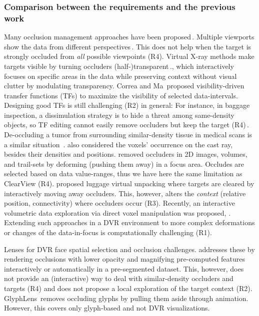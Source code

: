 \subsubsection{ Comparison between the requirements and the previous work }

Many occlusion management approaches have been proposed\,\cite{4483791}. Multiple viewports show the data from different perspectives\,\cite{WangBaldonado:2000:GUM:345513.345271}. This does not help when the target is strongly occluded from \emph{all} possible viewpoints (R4). Virtual X-ray methods make targets visible by turning occluders (half-)transparent\,\cite{Burns:2008:ACC:1457515.1409107}.\cite{4015450}, which interactively focuses on specific areas in the data while preserving context without visual clutter by modulating transparency. Correa and Ma\,\cite{5416704} proposed visibility-driven transfer functions (TFs) to maximize the visibility of selected data-intervals. Designing good TFs is still challenging (R2) in general: For instance, in baggage inspection, a dissimulation strategy is to hide a threat among same-density objects, so TF editing cannot easily remove occluders but keep the target (R4)\,\cite{7819413}. De-occluding a tumor from surrounding similar-density tissue in medical scans is a similar situation\, \cite{CGF:CGF12927}. 
\cite{CGF:CGF979} also considered the voxels' occurrence on the cast ray, besides their densities and positions.\cite{6787171} removed occluders in 2D images, volumes, and trail-sets by deforming (pushing them away) in a focus area. Occludes are selected based on data value-ranges, thus we have here the same limitation as ClearView (R4). \cite{Li:2012:LVV:2425296.2425325} proposed luggage virtual unpacking where targets are cleared by interactively moving away occluders. This, however, alters the \emph{context} (relative position, connectivity) where occluders occur (R3). Recently, an interactive volumetric data exploration via direct voxel manipulation was proposed, \cite{7819413}. Extending such approaches in a DVR environment to more complex deformations or changes of the data-in-focus is computationally challenging (R1).

Lenses for DVR face spatial selection and occlusion challenges. \cite{1532818} addresses these by rendering occlusions with lower opacity and magnifying pre-computed features interactively or automatically in a pre-segmented dataset. This, however, does not provide an (interactive) way to deal with similar-density occluders and targets (R4) and does not propose a local exploration of the target context (R2). GlyphLens\,\cite{7539643} removes occluding glyphs by pulling them aside through animation. However, this covers only glyph-based and not DVR visualizations. 

